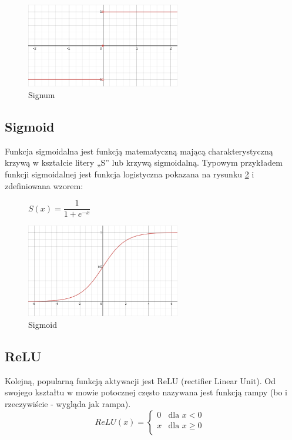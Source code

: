 \documentclass{article}
\begin{document}
\begin{figure}[H]
	\centering
	\includegraphics[width=0.6\textwidth,keepaspectratio=true]{Signum}
	\caption{
		Signum
	}
	\label{Signum}
\end{figure}


\subsection{Sigmoid}
Funkcja sigmoidalna jest funkcją matematyczną mającą charakterystyczną krzywą w kształcie litery „S” lub krzywą sigmoidalną.
Typowym przykładem funkcji sigmoidalnej jest funkcja logistyczna pokazana na rysunku \ref{Sigmoid} i zdefiniowana wzorem: 


\begin{figure}[H]
	\begin{center}
		$S(x) = \dfrac{1}{1 + e^{-x}}$
	\end{center}
	
	\centering
	\includegraphics[width=0.6\textwidth,keepaspectratio=true]{Sigmoid}
	\caption{
		Sigmoid
	}
	\label{Sigmoid}
\end{figure}

\subsection{ReLU}
Kolejną, popularną funkcją aktywacji jest ReLU (rectifier Linear Unit). Od swojego kształtu w mowie potocznej często nazywana jest funkcją rampy (bo i rzeczywiście - wygląda jak rampa).
\begin{equation}
	ReLU(x) = 
	\begin{cases}
		0 & \text{dla $x < 0$}\\
		x & \text{dla $x \geqslant 0$ }\\
	\end{cases}    
\end{equation}
\end{document}
